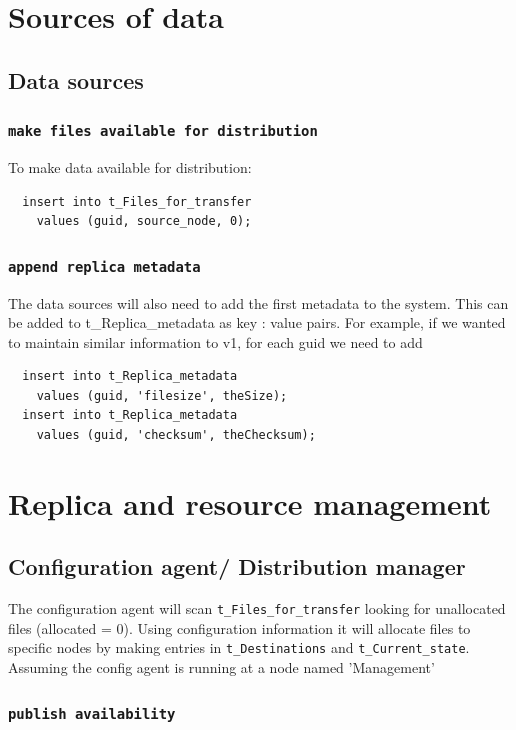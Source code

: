 \documentclass{cmspaper}
\begin{document}
\section{Sources of data}
\subsection{Data sources}

\subsubsection{\textbf{\texttt{make files available for distribution}}}
To make data available for distribution:

{\small\begin{verbatim}
  insert into t_Files_for_transfer
    values (guid, source_node, 0);
\end{verbatim}}

\subsubsection{\textbf{\texttt{append replica metadata}}}
The data sources will also need to add the first metadata to the system. This can be added to t\_Replica\_metadata as key : value pairs. For example, if we wanted to maintain similar information to v1, for each guid we need to add

{\small\begin{verbatim}
  insert into t_Replica_metadata
    values (guid, 'filesize', theSize);
  insert into t_Replica_metadata
    values (guid, 'checksum', theChecksum);
\end{verbatim}}

\section{Replica and resource management}
\subsection{Configuration agent/ Distribution manager}

The configuration agent will scan \texttt{t\_Files\_for\_transfer}
looking for unallocated files (allocated = 0).  Using configuration
information it will allocate files to specific nodes by making entries
in \texttt{t\_Destinations} and \texttt{t\_Current\_state}. Assuming the config agent is running at a node named 'Management'

\subsubsection{\textbf{\texttt{publish availability}}}
\end{document}
